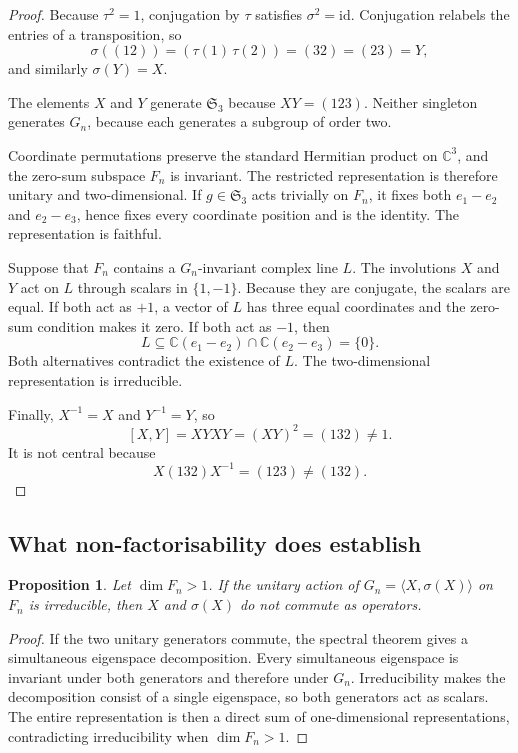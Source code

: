 \documentclass[11pt,a4paper]{article}
\newtheorem{proposition}[theorem]{Proposition}
\newcommand{\Sym}{\mathfrak{S}}
\begin{document}
    \begin{proof}
      Because $\tau^2=1$, conjugation by $\tau$ satisfies
      $\sigma^2=\mathrm{id}$.
      Conjugation relabels the entries of a transposition, so
      \[
        \sigma((12))=(\tau(1)\,\tau(2))=(32)=(23)=Y,
      \]
      and similarly $\sigma(Y)=X$.

      The elements $X$ and $Y$ generate $\Sym_3$ because $XY=(123)$.
      Neither singleton generates $G_n$, because each generates a subgroup of
      order two.

      Coordinate permutations preserve the standard Hermitian product on
      $\mathbb{C}^3$, and the zero-sum subspace $F_n$ is invariant.
      The restricted representation is therefore unitary and two-dimensional.
      If $g\in\Sym_3$ acts trivially on $F_n$, it fixes both $e_1-e_2$ and
      $e_2-e_3$, hence fixes every coordinate position and is the identity.
      The representation is faithful.

      Suppose that $F_n$ contains a $G_n$-invariant complex line $L$.
      The involutions $X$ and $Y$ act on $L$ through scalars in $\{1,-1\}$.
      Because they are conjugate, the scalars are equal.
      If both act as $+1$, a vector of $L$ has three equal coordinates and the
      zero-sum condition makes it zero.
      If both act as $-1$, then
      \[
        L\subseteq
        \mathbb{C}(e_1-e_2)\cap\mathbb{C}(e_2-e_3)=\{0\}.
      \]
      Both alternatives contradict the existence of $L$.
      The two-dimensional representation is irreducible.

      Finally, $X^{-1}=X$ and $Y^{-1}=Y$, so
      \[
        [X,Y]=XYXY=(XY)^2=(132)\neq 1.
      \]
      It is not central because
      \[
        X(132)X^{-1}=(123)\neq(132).
      \]
    \end{proof}

  \subsection{What non-factorisability does establish}

    \begin{proposition}
      \label{prop:commutator}
      Let $\dim F_n>1$.
      If the unitary action of $G_n=\langle X,\sigma(X)\rangle$ on $F_n$ is
      irreducible, then $X$ and $\sigma(X)$ do not commute as operators.
    \end{proposition}

    \begin{proof}
      If the two unitary generators commute, the spectral theorem gives a
      simultaneous eigenspace decomposition.
      Every simultaneous eigenspace is invariant under both generators and
      therefore under $G_n$.
      Irreducibility makes the decomposition consist of a single eigenspace, so
      both generators act as scalars.
      The entire representation is then a direct sum of one-dimensional
      representations, contradicting irreducibility when $\dim F_n>1$.
    \end{proof}
\end{document}
